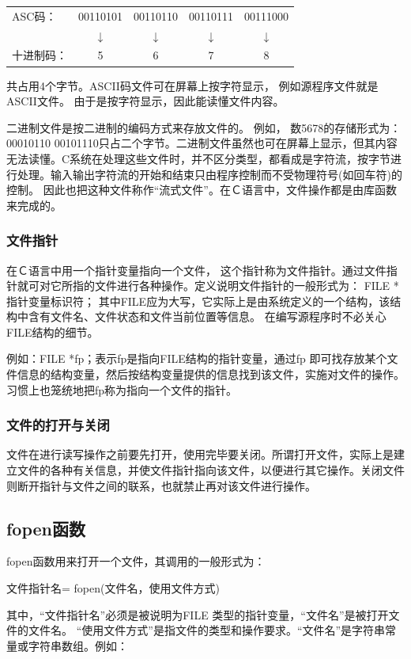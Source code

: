 \begin{center}
\begin{tabular}{lcccc}
ASC码：&00110101&00110110&00110111&00111000\\
                &$\downarrow$&$\downarrow$&$\downarrow$&$\downarrow$\\
十进制码：&5&6&7&8 
\end{tabular}
\end{center}
共占用4个字节。ASCII码文件可在屏幕上按字符显示， 例如源程序文件就是ASCII文件。 由于是按字符显示，因此能读懂文件内容。

二进制文件是按二进制的编码方式来存放文件的。 例如， 数5678的存储形式为： 00010110 00101110只占二个字节。二进制文件虽然也可在屏幕上显示，但其内容无法读懂。C系统在处理这些文件时，并不区分类型，都看成是字符流，按字节进行处理。输入输出字符流的开始和结束只由程序控制而不受物理符号(如回车符)的控制。 因此也把这种文件称作“流式文件”。在Ｃ语言中，文件操作都是由库函数来完成的。



\subsubsection{文件指针}
在Ｃ语言中用一个指针变量指向一个文件， 这个指针称为文件指针。通过文件指针就可对它所指的文件进行各种操作。定义说明文件指针的一般形式为： FILE *指针变量标识符； 其中FILE应为大写，它实际上是由系统定义的一个结构，该结构中含有文件名、文件状态和文件当前位置等信息。 在编写源程序时不必关心FILE结构的细节。

例如：FILE *fp；表示fp是指向FILE结构的指针变量，通过fp 即可找存放某个文件信息的结构变量，然后按结构变量提供的信息找到该文件，实施对文件的操作。习惯上也笼统地把fp称为指向一个文件的指针。



\subsubsection{文件的打开与关闭}
文件在进行读写操作之前要先打开，使用完毕要关闭。所谓打开文件，实际上是建立文件的各种有关信息，并使文件指针指向该文件，以便进行其它操作。关闭文件则断开指针与文件之间的联系，也就禁止再对该文件进行操作。



\subsection{fopen函数}
fopen函数用来打开一个文件，其调用的一般形式为：
\begin{center}
文件指针名= fopen(文件名，使用文件方式) 
\end{center}
其中，“文件指针名”必须是被说明为FILE 类型的指针变量，“文件名”是被打开文件的文件名。 “使用文件方式”是指文件的类型和操作要求。“文件名”是字符串常量或字符串数组。例如： 

